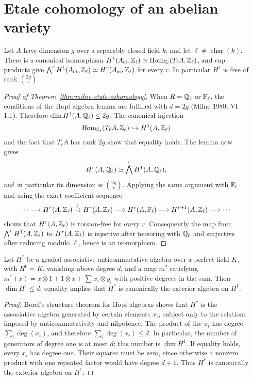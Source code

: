 \section{Etale cohomology of an abelian variety}
\begin{theorem}\label{thm:milne-etale-cohomology}
Let $A$ have dimension $g$ over a separably closed field $k$, and let $\ell\ne\operatorname{char}(k)$. There is a canonical isomorphism $H^1(A_{\rm et},\mathbb{Z}_\ell)\simeq\operatorname{Hom}_{\mathbb{Z}_\ell}(T_\ell A,\mathbb{Z}_\ell)$, and cup products give $\bigwedge^rH^1(A_{\rm et},\mathbb{Z}_\ell)\simeq H^r(A_{\rm et},\mathbb{Z}_\ell)$ for every $r$. In particular $H^r$ is free of rank $\binom{2g}{r}$.
\end{theorem}
\begin{proof}[Proof of Theorem~\ref{thm:milne-etale-cohomology}]
When $R=\mathbb{Q}_\ell$ or $\mathbb{F}_\ell$, the conditions of the Hopf algebra lemma are
fulfilled with $d=2g$ (Milne 1980, VI 1.1).  Therefore
$\dim H^1(A,\mathbb{Q}_\ell)\leq2g$.  The canonical injection
\[
\operatorname{Hom}_{\mathbb{Z}_\ell}(T_\ell A,\mathbb{Z}_\ell)\hookrightarrow H^1(A,\mathbb{Z}_\ell)
\]
and the fact that $T_\ell A$ has rank $2g$ show that equality holds.  The
lemma now gives
\[
H^r(A,\mathbb{Q}_\ell)\simeq\bigwedge^rH^1(A,\mathbb{Q}_\ell),
\]
and in particular its dimension is $\binom{2g}{r}$.  Applying the same
argument with $\mathbb{F}_\ell$ and using the exact coefficient sequence
\[
\cdots\longrightarrow H^r(A,\mathbb{Z}_\ell)\xrightarrow{\ell}
H^r(A,\mathbb{Z}_\ell)\longrightarrow H^r(A,\mathbb{F}_\ell)
\longrightarrow H^{r+1}(A,\mathbb{Z}_\ell)\longrightarrow\cdots
\]
shows that $H^r(A,\mathbb{Z}_\ell)$ is torsion-free for every $r$.  Consequently the
map from $\bigwedge^rH^1(A,\mathbb{Z}_\ell)$ to $H^r(A,\mathbb{Z}_\ell)$ is injective after
tensoring with $\mathbb{Q}_\ell$ and surjective after reducing modulo $\ell$, hence is
an isomorphism.
\end{proof}
\begin{lemma}\label{lem:milne-etale-hopf}
Let $H^*$ be a graded associative anticommutative algebra over a perfect field $K$, with $H^0=K$, vanishing above degree $d$, and a map $m^*$ satisfying $m^*(x)=x\otimes1+1\otimes x+\sum x_i\otimes y_i$ with positive degrees in the sum. Then $\dim H^1\le d$; equality implies that $H^*$ is canonically the exterior algebra on $H^1$.
\end{lemma}

\begin{proof}
Borel's structure theorem for Hopf algebras shows that $H^*$ is the
associative algebra generated by certain elements $x_i$, subject only to the
relations imposed by anticommutativity and nilpotence.  The product of the
$x_i$ has degree $\sum_i\deg(x_i)$, and therefore $\sum_i\deg(x_i)\leq d$.
In particular, the number of generators of degree one is at most $d$; this
number is $\dim H^1$.  If equality holds, every $x_i$ has degree one.  Their
squares must be zero, since otherwise a nonzero product with one repeated
factor would have degree $d+1$.  Thus $H^*$ is canonically the exterior
algebra on $H^1$.
\end{proof}



